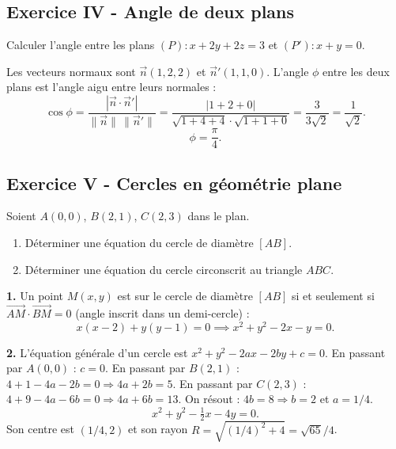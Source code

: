 \documentclass[12pt,a4paper]{article}
\begin{document}
\subsection*{Exercice IV - Angle de deux plans \niveau{\facile}}

\begin{boiteexercice}
Calculer l'angle entre les plans $(P) : x+2y+2z=3$ et $(P') : x+y=0$.
\end{boiteexercice}

\begin{boitecorrige}
Les vecteurs normaux sont $\vec{n}(1,2,2)$ et $\vec{n}'(1,1,0)$. L'angle $\phi$ entre les deux plans
est l'angle aigu entre leurs normales :
\[
  \cos\phi = \frac{|\vec{n}\cdot\vec{n}'|}{\|\vec{n}\|\,\|\vec{n}'\|}
           = \frac{|1+2+0|}{\sqrt{1+4+4}\cdot\sqrt{1+1+0}}
           = \frac{3}{3\sqrt{2}} = \frac{1}{\sqrt{2}}.
\]
\[
  \boxed{\phi = \frac{\pi}{4}.}
\]
\end{boitecorrige}

\subsection*{Exercice V - Cercles en géométrie plane \niveau{\moyen}}

\begin{boiteexercice}
Soient $A(0,0)$, $B(2,1)$, $C(2,3)$ dans le plan.
\begin{enumerate}
  \item Déterminer une équation du cercle de diamètre $[AB]$.
  \item Déterminer une équation du cercle circonscrit au triangle $ABC$.
\end{enumerate}
\end{boiteexercice}

\begin{boitecorrige}
\textbf{1.} Un point $M(x,y)$ est sur le cercle de diamètre $[AB]$ si et seulement si
$\overrightarrow{AM}\cdot\overrightarrow{BM} = 0$ (angle inscrit dans un demi-cercle) :
\[
  x(x-2) + y(y-1) = 0 \implies \boxed{x^2 + y^2 - 2x - y = 0.}
\]

\textbf{2.} L'équation générale d'un cercle est $x^2+y^2-2ax-2by+c=0$.
En passant par $A(0,0)$ : $c=0$.
En passant par $B(2,1)$ : $4+1-4a-2b=0 \Rightarrow 4a+2b=5$.
En passant par $C(2,3)$ : $4+9-4a-6b=0 \Rightarrow 4a+6b=13$.
On résout : $4b=8 \Rightarrow b=2$ et $a=1/4$.
\[
  \boxed{x^2+y^2-\tfrac{1}{2}x-4y = 0.}
\]
Son centre est $(1/4, 2)$ et son rayon $R = \sqrt{(1/4)^2+4} = \sqrt{65}/4$.
\end{boitecorrige}
\end{document}
